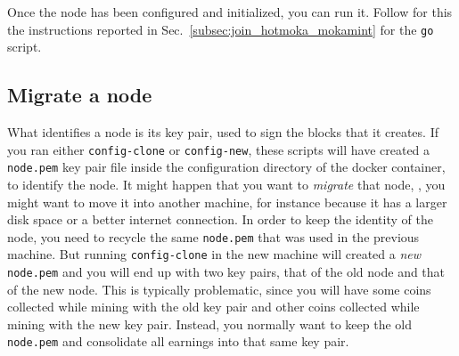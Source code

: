 Once the node has been configured and initialized, you can run it.
Follow for this the instructions reported in Sec.~\ref{subsec:join_hotmoka_mokamint}
for the \texttt{go} script.

\subsection{Migrate a node}\label{subsec:migrate_a_node}

What identifies a node is its key pair, used to sign the blocks that it creates.
If you ran either \texttt{config-clone} or \texttt{config-new}, these scripts will
have created a \texttt{node.pem} key pair file inside the configuration directory of the docker
container, to identify the node. It might happen that you want to
\emph{migrate} that node, \ie{}, you might want to move it into another machine, for instance
because it has a larger disk space or a better internet connection. In order to keep the
identity of the node, you need to recycle the same \texttt{node.pem} that was used in
the previous machine. But running \texttt{config-clone} in the new machine will created
a \emph{new} \texttt{node.pem} and you will end up with two key pairs, that of the old
node and that of the new node. This is typically problematic, since you will have some coins collected
while mining with the old key pair and other coins collected while mining with the new key pair.
Instead, you normally want to keep the old \texttt{node.pem} and consolidate all earnings
into that same key pair.


